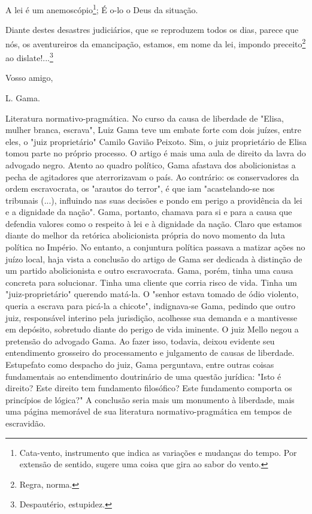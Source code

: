 A lei é um anemoscópio\footnote{Cata-vento, instrumento que indica as
  variações e mudanças do tempo. Por extensão de sentido, sugere uma
  coisa que gira ao sabor do vento.}; É o-lo o Deus da situação.

Diante destes desastres judiciários, que se reproduzem todos os dias,
parece que nós, os aventureiros da emancipação, estamos, em nome da lei,
impondo preceito\footnote{Regra, norma.} ao dislate!...\footnote{
  Despautério, estupidez.}

Vosso amigo,

L. Gama.
\pagebreak
\mbox{}\vfill
\thispagestyle{empty}

{\small\noindent
Literatura normativo-pragmática. No curso da causa de liberdade de
"Elisa, mulher branca, escrava", Luiz Gama teve um embate forte com dois
juízes, entre eles, o "juiz proprietário" Camilo Gavião Peixoto. Sim, o
juiz proprietário de Elisa tomou parte no próprio processo. O artigo é
mais uma aula de direito da lavra do advogado negro. Atento ao quadro
político, Gama afastava dos abolicionistas a pecha de agitadores que
aterrorizavam o país. Ao contrário: os conservadores da ordem
escravocrata, os "arautos do terror", é que iam "acastelando-se nos
tribunais (...), influindo nas suas decisões e pondo em perigo a
providência da lei e a dignidade da nação". Gama, portanto, chamava para
si e para a causa que defendia valores como o respeito à lei e à
dignidade da nação. Claro que estamos diante do melhor da retórica
abolicionista própria do novo momento da luta política no Império. No
entanto, a conjuntura política passava a matizar ações no juízo local,
haja vista a conclusão do artigo de Gama ser dedicada à distinção de um
partido abolicionista e outro escravocrata. Gama, porém, tinha uma causa
concreta para solucionar. Tinha uma cliente que corria risco de vida.
Tinha um "juiz-proprietário" querendo matá-la. O "senhor estava tomado
de ódio violento, queria a escrava para picá-la a chicote", indignava-se
Gama, pedindo que outro juiz, responsável interino pela jurisdição,
acolhesse sua demanda e a mantivesse em depósito, sobretudo diante do
perigo de vida iminente. O juiz Mello negou a pretensão do advogado
Gama. Ao fazer isso, todavia, deixou evidente seu entendimento grosseiro
do processamento e julgamento de causas de liberdade. Estupefato como
despacho do juiz, Gama perguntava, entre outras coisas fundamentais ao
entendimento doutrinário de uma questão jurídica: "Isto é direito? Este
direito tem fundamento filosófico? Este fundamento comporta os
princípios de lógica?" A conclusão seria mais um monumento à liberdade,
mais uma página memorável de sua literatura normativo-pragmática em
tempos de escravidão.}

